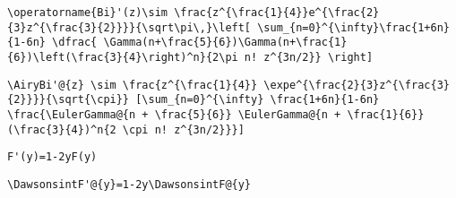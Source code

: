 \newsavebox\AVMA
\begin{lrbox}{\AVMA}
 \begin{minipage}[t]{0.82\textwidth}
  \lstinline[language={[latex]TeX},mathescape,breaklines=true]""
 \end{minipage}
\end{lrbox}
\newsavebox\AWT
\begin{lrbox}{\AWT}
 \begin{minipage}[t]{0.82\textwidth}
  \lstinline[language={[latex]TeX},mathescape,breaklines=true]"\operatorname{Bi}'(z)\sim \frac{z^{\frac{1}{4}}e^{\frac{2}{3}z^{\frac{3}{2}}}}{\sqrt\pi\,}\left[ \sum_{n=0}^{\infty}\frac{1+6n}{1-6n} \dfrac{ \Gamma(n+\frac{5}{6})\Gamma(n+\frac{1}{6})\left(\frac{3}{4}\right)^n}{2\pi n! z^{3n/2}} \right]"
 \end{minipage}
\end{lrbox}
\newsavebox\AWST
\begin{lrbox}{\AWST}
 \begin{minipage}[t]{0.82\textwidth}
  \lstinline[language={[latex]TeX},mathescape,breaklines=true]"\AiryBi'@{z} \sim \frac{z^{\frac{1}{4}} \expe^{\frac{2}{3}z^{\frac{3}{2}}}}{\sqrt{\cpi}} [\sum_{n=0}^{\infty} \frac{1+6n}{1-6n} \frac{\EulerGamma@{n + \frac{5}{6}} \EulerGamma@{n + \frac{1}{6}}(\frac{3}{4})^n{2 \cpi n! z^{3n/2}}}]"
 \end{minipage}
\end{lrbox}
\newsavebox\AWMM
\begin{lrbox}{\AWMM}
 \begin{minipage}[t]{0.82\textwidth}
  \lstinline[language={[latex]TeX},mathescape,breaklines=true]""
 \end{minipage}
\end{lrbox}
\newsavebox\AWMA
\begin{lrbox}{\AWMA}
 \begin{minipage}[t]{0.82\textwidth}
  \lstinline[language={[latex]TeX},mathescape,breaklines=true]""
 \end{minipage}
\end{lrbox}
\newsavebox\AXT
\begin{lrbox}{\AXT}
 \begin{minipage}[t]{0.82\textwidth}
  \lstinline[language={[latex]TeX},mathescape,breaklines=true]"F'(y)=1-2yF(y)"
 \end{minipage}
\end{lrbox}
\newsavebox\AXST
\begin{lrbox}{\AXST}
 \begin{minipage}[t]{0.82\textwidth}
  \lstinline[language={[latex]TeX},mathescape,breaklines=true]"\DawsonsintF'@{y}=1-2y\DawsonsintF@{y}"
 \end{minipage}
\end{lrbox}
